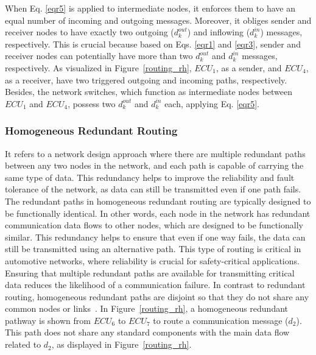      
    When Eq. \eqref{eqr5} is applied to intermediate nodes, it enforces them to have an equal number of incoming and outgoing messages. Moreover, it obliges sender and receiver nodes to have exactly two outgoing ($d_k^{out}$) and inflowing ($d_k^{in}$) messages, respectively. This is crucial because based on Eqs. \eqref{eqr1} and \eqref{eqr3}, sender and receiver nodes can potentially have more than two $d_k^{out}$ and $d_k^{in}$ messages, respectively. As visualized in Figure~\ref{routing_rh}, $ECU_1$, as a sender, and $ECU_4$, as a receiver, have two triggered outgoing and incoming paths, respectively. Besides, the network switches, which function as intermediate nodes between $ECU_1$ and $ECU_4$, possess two $d_k^{out}$ and $d_k^{in}$ each, applying Eq. \eqref{eqr5}.

     
  
    
   
    \subsubsection{Homogeneous Redundant Routing}
    
    It refers to a network design approach where there are multiple redundant paths between any two nodes in the network, and each path is capable of carrying the same type of data. This redundancy helps to improve the reliability and fault tolerance of the network, as data can still be transmitted even if one path fails. The redundant paths in homogeneous redundant routing are typically designed to be functionally identical. In other words, each node in the network has redundant communication data flows to other nodes, which are designed to be functionally similar. This redundancy helps to ensure that even if one way fails, the data can still be transmitted using an alternative path. 
    This type of routing is critical in automotive networks, where reliability is crucial for safety-critical applications. Ensuring that multiple redundant paths are available for transmitting critical data reduces the likelihood of a communication failure. In contrast to redundant routing, homogeneous redundant paths are disjoint so that they do not share any common nodes or links~\cite{9565115, iso26262}. In Figure~\ref{routing_rh}, a homogeneous redundant pathway is shown from $ECU_6$ to $ECU_7$ to route a communication message ($d_2$). This path does not share any standard components with the main data flow related to $d_2$, as displayed in Figure~\ref{routing_rh}. 
    
